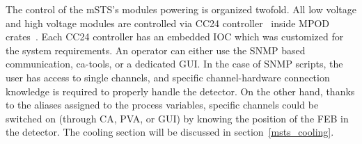 The control of the \gls{mSTS}'s modules powering is organized twofold. All low voltage and high voltage modules are controlled via CC24 controller~\cite{cc24} inside MPOD crates~\cite{mpod}. Each CC24 controller has an embedded \gls{IOC} which was customized for the system requirements.  An operator can either use the \gls{SNMP} based communication, ca-tools, or a dedicated \gls{GUI}. In the case of SNMP scripts, the user has access to single channels, and specific channel-hardware connection knowledge is required to properly handle the detector. On the other hand, thanks to the aliases assigned to the process variables, specific channels could be switched on (through CA, PVA, or \gls{GUI}) by knowing the position of the \gls{FEB} in the detector. The cooling section will be discussed in section~\ref{msts_cooling}.


